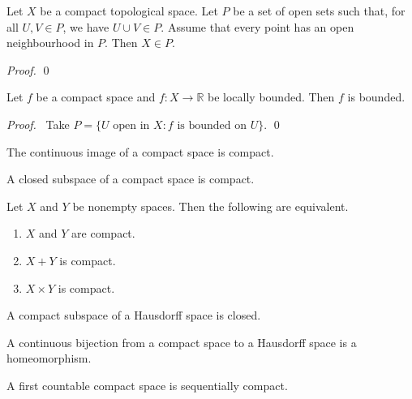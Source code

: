 \begin{prop}
Let $X$ be a compact topological space. Let $P$ be a set of open sets such that, for all $U,V \in P$, we have $U \cup V \in P$. Assume that every point has an open neighbourhood in $P$. Then $X \in P$.
\end{prop}

\begin{proof}
\pf
{}
\qed
\end{proof}

\begin{cor}
Let $f$ be a compact space and $f : X \rightarrow \mathbb{R}$ be locally bounded. Then $f$ is bounded.
\end{cor}

\begin{proof}
\pf\ Take $P = \{ U \text{ open in } X : f \text{ is bounded on } U \}$. \qed
\end{proof}

\begin{prop}
The continuous image of a compact space is compact.
\end{prop}

\begin{prop}
A closed subspace of a compact space is compact.
\end{prop}

\begin{prop}
Let $X$ and $Y$ be nonempty spaces. Then the following are equivalent.
\begin{enumerate}
\item $X$ and $Y$ are compact.
\item $X + Y$ is compact.
\item $X \times Y$ is compact.
\end{enumerate}
\end{prop}

\begin{prop}
A compact subspace of a Hausdorff space is closed.
\end{prop}

\begin{prop}
A continuous bijection from a compact space to a Hausdorff space is a homeomorphism.
\end{prop}

\begin{prop}
A first countable compact space is sequentially compact.
\end{prop}

